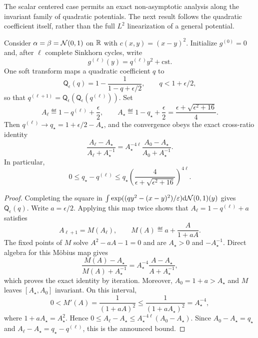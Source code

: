 The scalar centered case permits an exact non-asymptotic analysis along the invariant family of quadratic potentials. The next result follows the quadratic coefficient itself, rather than the full $L^2$ linearization of a general potential.

\begin{prop}\label{prop-gaussian-sinkhorn-1d-rate}
	Consider $\alpha=\beta=\mathcal{N}(0,1)$ on $\mathbb{R}$ with $c(x,y)=(x-y)^2$. Initialize $g^{(0)}=0$ and, after $\ell$ complete Sinkhorn cycles, write
	\[
		g^{(\ell)}(y)=q^{(\ell)}y^2+\mathrm{cst}.
	\]
	One soft transform maps a quadratic coefficient $q$ to
	\[
		\mathsf Q_\epsilon(q)
		=
		1-\frac{1}{1-q+\epsilon/2},
		\qquad q<1+\epsilon/2,
	\]
	so that $q^{(\ell+1)}=\mathsf Q_\epsilon(\mathsf Q_\epsilon(q^{(\ell)}))$. Set
	\[
		A_\ell\eqdef 1-q^{(\ell)}+\frac{\epsilon}{2},
		\qquad
		A_\star\eqdef 1-q_\star+\frac{\epsilon}{2}
		=
		\frac{\epsilon+\sqrt{\epsilon^2+16}}{4}.
	\]
	Then $q^{(\ell)}\to q_\star=1+\epsilon/2-A_\star$, and the convergence obeys the exact cross-ratio identity
	\[
		\frac{A_\ell-A_\star}{A_\ell+A_\star^{-1}}
		=
		A_\star^{-4\ell}
		\frac{A_0-A_\star}{A_0+A_\star^{-1}}.
	\]
	In particular,
	\[
		0\leq q_\star-q^{(\ell)}
		\leq
		q_\star
		\left(\frac{4}{\epsilon+\sqrt{\epsilon^2+16}}\right)^{4\ell}.
	\]
\end{prop}

\begin{proof}
	Completing the square in $\int\exp((q y^2-(x-y)^2)/\varepsilon)\mathrm{d}\mathcal{N}(0,1)(y)$ gives $\mathsf Q_\epsilon(q)$. Write $a=\epsilon/2$. Applying this map twice shows that $A_\ell=1-q^{(\ell)}+a$ satisfies
	\[
		A_{\ell+1}=M(A_\ell),
		\qquad
		M(A)\eqdef a+\frac{A}{1+aA}.
	\]
	The fixed points of $M$ solve $A^2-aA-1=0$ and are $A_\star>0$ and $-A_\star^{-1}$. Direct algebra for this M\"obius map gives
	\[
		\frac{M(A)-A_\star}{M(A)+A_\star^{-1}}
		=
		A_\star^{-4}
		\frac{A-A_\star}{A+A_\star^{-1}},
	\]
	which proves the exact identity by iteration. Moreover, $A_0=1+a>A_\star$ and $M$ leaves $[A_\star,A_0]$ invariant. On this interval,
	\[
		0<M'(A)=\frac{1}{(1+aA)^2}
		\leq
		\frac{1}{(1+aA_\star)^2}
		=A_\star^{-4},
	\]
	where $1+aA_\star=A_\star^2$. Hence $0\leq A_\ell-A_\star\leq A_\star^{-4\ell}(A_0-A_\star)$. Since $A_0-A_\star=q_\star$ and $A_\ell-A_\star=q_\star-q^{(\ell)}$, this is the announced bound.
\end{proof}

